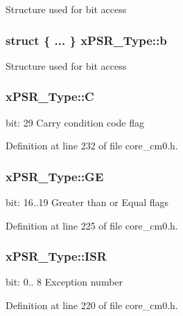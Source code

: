 Structure used for bit access \hypertarget{unionx_p_s_r___type_a45ed8981cba3995bc0bd339cb99ba018}{
\subsubsection[{b}]{\setlength{\rightskip}{0pt plus 5cm}struct \{ ... \}   x\-P\-S\-R\-\_\-\-Type\-::b}}\label{unionx_p_s_r___type_a45ed8981cba3995bc0bd339cb99ba018}
Structure used for bit access \hypertarget{unionx_p_s_r___type_a40213a6b5620410cac83b0d89564609d}{
\subsubsection[{C}]{ x\-P\-S\-R\-\_\-\-Type\-::\-C}}\label{unionx_p_s_r___type_a40213a6b5620410cac83b0d89564609d}
bit\-: 29 Carry condition code flag 

Definition at line 232 of file core\-\_\-cm0.\-h.

\hypertarget{unionx_p_s_r___type_a2d0ec4ccae337c1df5658f8cf4632e76}{
\subsubsection[{G\-E}]{ x\-P\-S\-R\-\_\-\-Type\-::\-G\-E}}\label{unionx_p_s_r___type_a2d0ec4ccae337c1df5658f8cf4632e76}
bit\-: 16..19 Greater than or Equal flags 

Definition at line 225 of file core\-\_\-cm0.\-h.

\hypertarget{unionx_p_s_r___type_a3e9120dcf1a829fc8d2302b4d0673970}{
\subsubsection[{I\-S\-R}]{ x\-P\-S\-R\-\_\-\-Type\-::\-I\-S\-R}}\label{unionx_p_s_r___type_a3e9120dcf1a829fc8d2302b4d0673970}
bit\-: 0.. 8 Exception number 

Definition at line 220 of file core\-\_\-cm0.\-h.


